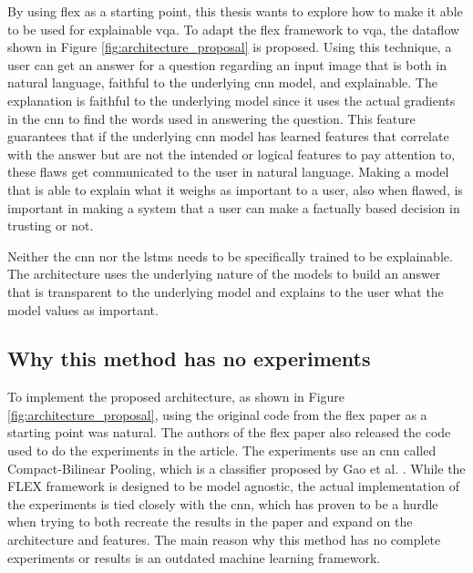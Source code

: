                 
        


        By using \gls{flex} as a starting point, this thesis wants to explore how to make it able to be used for explainable \gls{vqa}. To adapt the \gls{flex} framework to \gls{vqa}, the dataflow shown in Figure \ref{fig:architecture_proposal} is proposed. Using this technique, a user can get an answer for a question regarding an input image that is both in natural language, faithful to the underlying \gls{cnn} model, and explainable. The explanation is faithful to the underlying model since it uses the actual gradients in the \gls{cnn} to find the words used in answering the question. This feature guarantees that if the underlying \gls{cnn} model has learned features that correlate with the answer but are not the intended or logical features to pay attention to, these flaws get communicated to the user in natural language. Making a model that is able to explain what it weighs as important to a user, also when flawed, is important in making a system that a user can make a factually based decision in trusting or not. 

        Neither the \gls{cnn} nor the \glspl{lstm} needs to be specifically trained to be explainable. The architecture uses the underlying nature of the models to build an answer that is transparent to the underlying model and explains to the user what the model values as important. 



        \subsection{Why this method has no experiments}
        \label{subsec:no_flex}

            To implement the proposed architecture, as shown in Figure \ref{fig:architecture_proposal}, using the original code from the \gls{flex} paper as a starting point was natural.
            The authors of the \gls{flex} paper also released the code used to do the experiments in the article. The experiments use an \gls{cnn} called Compact-Bilinear Pooling, which is a classifier proposed by Gao et al. \cite{gaoCompactBilinearPooling2016}. While the FLEX framework is designed to be model agnostic, the actual implementation of the experiments is tied closely with the \gls{cnn}, which has proven to be a hurdle when trying to both recreate the results in the paper and expand on the architecture and features. The main reason why this method has no complete experiments or results is an outdated machine learning framework.
    
